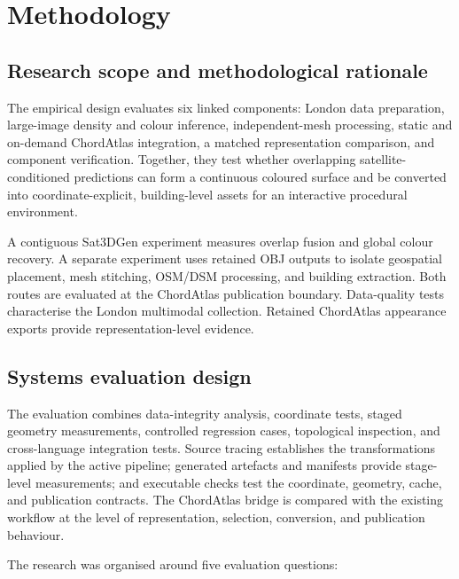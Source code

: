 \chapter{Methodology} \label{Chap3}\label{chap:methodology}

\section{Research scope and methodological rationale}

The empirical design evaluates six linked components: London data preparation,
large-image density and colour inference, independent-mesh processing, static
and on-demand ChordAtlas integration, a matched representation comparison, and
component verification.  Together,
they test whether overlapping satellite-conditioned predictions can form a
continuous coloured surface and be converted into coordinate-explicit,
building-level assets for an interactive procedural environment.

A contiguous Sat3DGen experiment measures overlap fusion and global colour
recovery.  A separate experiment uses retained OBJ outputs to isolate
geospatial placement, mesh stitching, OSM/DSM processing, and building
extraction.  Both routes are evaluated at the ChordAtlas publication boundary.
Data-quality tests characterise the London multimodal collection.  Retained
ChordAtlas appearance exports provide representation-level evidence.

\section{Systems evaluation design}

The evaluation combines data-integrity analysis, coordinate tests, staged
geometry measurements, controlled regression cases, topological inspection,
and cross-language integration tests.  Source tracing establishes the
transformations applied by the active pipeline; generated artefacts and
manifests provide stage-level measurements; and executable checks test the
coordinate, geometry, cache, and publication contracts.  The ChordAtlas bridge
is compared with the existing workflow at the level of representation,
selection, conversion, and publication behaviour.

The research was organised around five evaluation questions:

